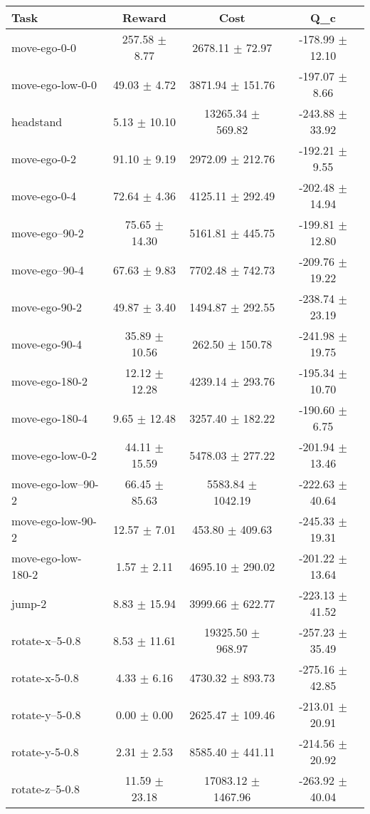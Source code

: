 \begin{tabular}{|lccc|}
\hline
Task & Reward & Cost & Q_c \\
\hline
move-ego-0-0 & 257.58 $\pm$ 8.77 & 2678.11 $\pm$ 72.97 & -178.99 $\pm$ 12.10 \\
move-ego-low-0-0 & 49.03 $\pm$ 4.72 & 3871.94 $\pm$ 151.76 & -197.07 $\pm$ 8.66 \\
headstand & 5.13 $\pm$ 10.10 & 13265.34 $\pm$ 569.82 & -243.88 $\pm$ 33.92 \\
move-ego-0-2 & 91.10 $\pm$ 9.19 & 2972.09 $\pm$ 212.76 & -192.21 $\pm$ 9.55 \\
move-ego-0-4 & 72.64 $\pm$ 4.36 & 4125.11 $\pm$ 292.49 & -202.48 $\pm$ 14.94 \\
move-ego--90-2 & 75.65 $\pm$ 14.30 & 5161.81 $\pm$ 445.75 & -199.81 $\pm$ 12.80 \\
move-ego--90-4 & 67.63 $\pm$ 9.83 & 7702.48 $\pm$ 742.73 & -209.76 $\pm$ 19.22 \\
move-ego-90-2 & 49.87 $\pm$ 3.40 & 1494.87 $\pm$ 292.55 & -238.74 $\pm$ 23.19 \\
move-ego-90-4 & 35.89 $\pm$ 10.56 & 262.50 $\pm$ 150.78 & -241.98 $\pm$ 19.75 \\
move-ego-180-2 & 12.12 $\pm$ 12.28 & 4239.14 $\pm$ 293.76 & -195.34 $\pm$ 10.70 \\
move-ego-180-4 & 9.65 $\pm$ 12.48 & 3257.40 $\pm$ 182.22 & -190.60 $\pm$ 6.75 \\
move-ego-low-0-2 & 44.11 $\pm$ 15.59 & 5478.03 $\pm$ 277.22 & -201.94 $\pm$ 13.46 \\
move-ego-low--90-2 & 66.45 $\pm$ 85.63 & 5583.84 $\pm$ 1042.19 & -222.63 $\pm$ 40.64 \\
move-ego-low-90-2 & 12.57 $\pm$ 7.01 & 453.80 $\pm$ 409.63 & -245.33 $\pm$ 19.31 \\
move-ego-low-180-2 & 1.57 $\pm$ 2.11 & 4695.10 $\pm$ 290.02 & -201.22 $\pm$ 13.64 \\
jump-2 & 8.83 $\pm$ 15.94 & 3999.66 $\pm$ 622.77 & -223.13 $\pm$ 41.52 \\
rotate-x--5-0.8 & 8.53 $\pm$ 11.61 & 19325.50 $\pm$ 968.97 & -257.23 $\pm$ 35.49 \\
rotate-x-5-0.8 & 4.33 $\pm$ 6.16 & 4730.32 $\pm$ 893.73 & -275.16 $\pm$ 42.85 \\
rotate-y--5-0.8 & 0.00 $\pm$ 0.00 & 2625.47 $\pm$ 109.46 & -213.01 $\pm$ 20.91 \\
rotate-y-5-0.8 & 2.31 $\pm$ 2.53 & 8585.40 $\pm$ 441.11 & -214.56 $\pm$ 20.92 \\
rotate-z--5-0.8 & 11.59 $\pm$ 23.18 & 17083.12 $\pm$ 1467.96 & -263.92 $\pm$ 40.04 \\

\end{tabular}
